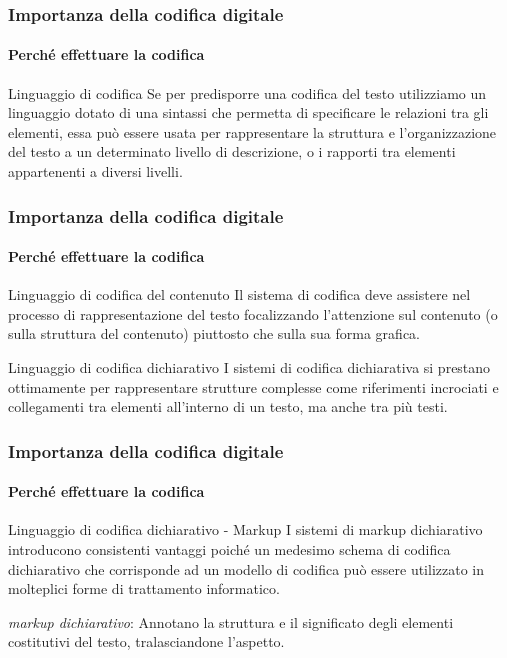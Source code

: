 \begin{frame}
	\frametitle{Importanza della codifica digitale}
	\framesubtitle{Perché effettuare la codifica}
	\addtocounter{nframe}{1}

	\begin{block}{Linguaggio di codifica}
		Se per predisporre una codifica del testo utilizziamo un linguaggio dotato di una sintassi che permetta di specificare le relazioni tra gli elementi, essa può essere usata per rappresentare la struttura e l’organizzazione del testo a un determinato livello di descrizione, o i rapporti tra elementi appartenenti a diversi livelli.
	\end{block}

\end{frame}

\begin{frame}
	\frametitle{Importanza della codifica digitale}
	\framesubtitle{Perché effettuare la codifica}
	\addtocounter{nframe}{1}

	\begin{block}{Linguaggio di codifica del contenuto}
		Il sistema di codifica deve assistere nel processo di rappresentazione del testo focalizzando l’attenzione sul contenuto (o sulla struttura del contenuto) piuttosto che sulla sua forma grafica.
	\end{block}

	\begin{block}{Linguaggio di codifica dichiarativo}
		I sistemi di codifica dichiarativa si prestano ottimamente per rappresentare strutture complesse come riferimenti incrociati e collegamenti tra elementi all’interno di un testo, ma anche tra più testi.
	\end{block}

\end{frame}

\begin{frame}
	\frametitle{Importanza della codifica digitale}
	\framesubtitle{Perché effettuare la codifica}
	\addtocounter{nframe}{1}

	\begin{block}{Linguaggio di codifica dichiarativo - Markup}
		I sistemi di markup dichiarativo introducono consistenti vantaggi poiché un medesimo schema di codifica dichiarativo che corrisponde ad un modello di codifica può essere utilizzato in molteplici forme di trattamento informatico.
	\end{block}

	\textit{markup dichiarativo}: Annotano la struttura e il significato degli elementi costitutivi del testo, tralasciandone l’aspetto.

\end{frame}

